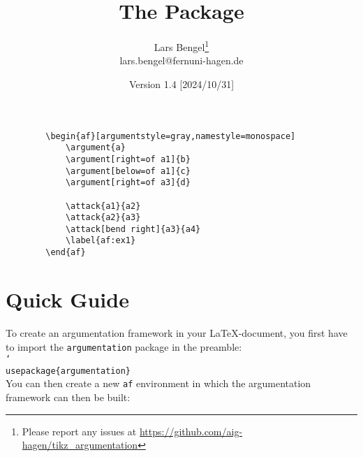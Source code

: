 \documentclass{scrartcl}
\title{The \argumentation Package}
\author{Lars Bengel\footnote{Please report any issues at \url{https://github.com/aig-hagen/tikz_argumentation}}\\\small lars.bengel@fernuni-hagen.de}
\date{Version 1.4 [2024/10/31]}
\newcommand{\argumentation}{\texttt{argumentation}\xspace}
\DeclareRobustCommand\cs[2][-1.6cm]{\hspace{#1}\texttt{\char`\\#2}}
\begin{document}
\maketitle

\begin{minipage}{.26\textwidth}
    \centering
        \begin{af}[argumentstyle=gray,namestyle=monospace]
    
            \label{af:ex1}
        \end{af}
\end{minipage}
\begin{minipage}{.5\textwidth}
    \begin{small}
    \begin{verbatim}
        \begin{af}[argumentstyle=gray,namestyle=monospace]
            \argument{a}
            \argument[right=of a1]{b}
            \argument[below=of a1]{c}
            \argument[right=of a3]{d}
    
            \attack{a1}{a2}
            \attack{a2}{a3}
            \attack[bend right]{a3}{a4}
            \label{af:ex1}
        \end{af}
    \end{verbatim}
    \end{small}
\end{minipage}


\tableofcontents
\newpage

\section{Quick Guide}\label{sec:quick}
\noindent
To create an argumentation framework in your \LaTeX-document, you first have to import the \argumentation package in the preamble:\\

\noindent\cs[0cm]{usepackage\{argumentation\}}\\

You can then create a new \texttt{af} environment in which the argumentation framework can then be built:\\
\end{document}
